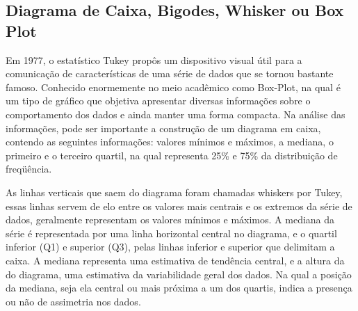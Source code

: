
\subsection{Diagrama de Caixa, Bigodes, Whisker ou Box Plot}

\inic Em 1977, o estatístico Tukey propôs um dispositivo visual útil
para a comunicação de características de uma série de dados que se
tornou bastante famoso. Conhecido enormemente no meio acadêmico
como Box-Plot, na qual é um tipo de gráfico que objetiva
apresentar diversas informações sobre o comportamento dos dados e
ainda manter uma forma compacta. Na análise das informações, pode
ser importante a construção de um diagrama em caixa, contendo as
seguintes informações: valores mínimos e máximos, a mediana, o
primeiro e o terceiro quartil, na qual representa 25\% e 75\% da
distribuição de freqüência.\vskip0.3cm


\begin{figure}[!htb]
\end{figure}

\newpage

\inic As linhas verticais que saem do diagrama foram chamadas whiskers
por Tukey, essas linhas servem de elo entre os valores mais
centrais e os extremos da série de dados, geralmente representam
os valores mínimos e máximos. A mediana da série é representada
por uma linha horizontal central no diagrama, e o quartil inferior
(Q1) e superior (Q3), pelas linhas inferior e superior que
delimitam a caixa. A mediana representa uma estimativa de tendência central, e a altura da do diagrama, uma estimativa da variabilidade geral dos
dados. Na qual a posição da mediana, seja ela central ou mais
próxima a um dos quartis, indica a presença ou não de assimetria
nos dados.\vskip0.3cm

